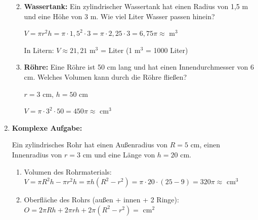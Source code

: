 \begin{enumerate}[label=\arabic*., resume]
\begin{enumerate}[label=\alph*)]
        \vspace{0.5cm}
        \item \textbf{Wassertank:} Ein zylindrischer Wassertank hat einen Radius von 1{,}5 m und eine Höhe von 3 m. Wie viel Liter Wasser passen hinein?

        $V = \pi r^2 h = \pi \cdot 1{,}5^2 \cdot 3 = \pi \cdot 2{,}25 \cdot 3 = 6{,}75\pi \approx$ \underline{\hspace{2cm}} m$^3$

        In Litern: $V \approx 21{,}21$ m$^3$ = \underline{\hspace{2cm}} Liter (1 m$^3$ = 1000 Liter)

        \vspace{0.5cm}
        \item \textbf{Röhre:} Eine Röhre ist 50 cm lang und hat einen Innendurchmesser von 6 cm. Welches Volumen kann durch die Röhre fließen?

        $r = 3$ cm, $h = 50$ cm

        $V = \pi \cdot 3^2 \cdot 50 = 450\pi \approx$ \underline{\hspace{2cm}} cm$^3$
    \end{enumerate}

    \vspace{1cm}

    \item \textbf{Komplexe Aufgabe:}
    \vspace{0.5cm}

    Ein zylindrisches Rohr hat einen Außenradius von $R = 5$ cm, einen Innenradius von $r = 3$ cm und eine Länge von $h = 20$ cm.

    \begin{enumerate}[label=\alph*)]
        \item Volumen des Rohrmaterials:
        $V = \pi R^2 h - \pi r^2 h = \pi h(R^2 - r^2) = \pi \cdot 20 \cdot (25 - 9) = 320\pi \approx$ \underline{\hspace{2cm}} cm$^3$

        \vspace{0.3cm}
        \item Oberfläche des Rohrs (außen + innen + 2 Ringe):
        $O = 2\pi R h + 2\pi r h + 2\pi(R^2 - r^2) =$ \underline{\hspace{5cm}} cm$^2$
    \end{enumerate}

\end{enumerate}